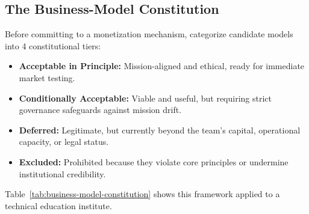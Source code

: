 \subsection{The Business-Model Constitution}

Before committing to a monetization mechanism, categorize candidate models into 4 constitutional tiers:

\begin{itemize}[leftmargin=11pt,itemsep=1.5pt,topsep=1.5pt,parsep=0pt]
  \item \textbf{Acceptable in Principle:} Mission-aligned and ethical, ready for immediate market testing.
  \item \textbf{Conditionally Acceptable:} Viable and useful, but requiring strict governance safeguards against mission drift.
  \item \textbf{Deferred:} Legitimate, but currently beyond the team's capital, operational capacity, or legal status.
  \item \textbf{Excluded:} Prohibited because they violate core principles or undermine institutional credibility.
\end{itemize}

Table~\ref{tab:business-model-constitution} shows this framework applied to a technical education institute.

